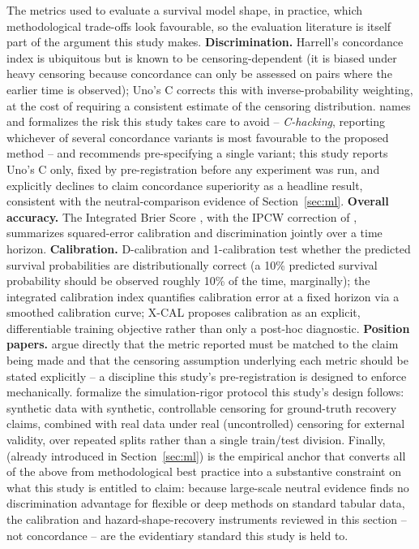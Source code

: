 \documentclass[11pt]{article}
\begin{document}
The metrics used to evaluate a survival model shape, in practice, which
methodological trade-offs look favourable, so the evaluation literature is
itself part of the argument this study makes. \textbf{Discrimination.}
Harrell's concordance index is ubiquitous but is known to be
censoring-dependent (it is biased under heavy censoring because
concordance can only be assessed on pairs where the earlier time is
observed); Uno's C \citep{uno2011} corrects this with inverse-probability
weighting, at the cost of requiring a consistent estimate of the
censoring distribution. \citet{sonabend2022chacking} names and formalizes
the risk this study takes care to avoid -- \emph{C-hacking}, reporting
whichever of several concordance variants is most favourable to the
proposed method -- and recommends pre-specifying a single variant; this
study reports Uno's C only, fixed by pre-registration before any
experiment was run, and explicitly declines to claim concordance
superiority as a headline result, consistent with the neutral-comparison
evidence of Section~\ref{sec:ml}. \textbf{Overall accuracy.} The
Integrated Brier Score \citep{graf1999ibs}, with the IPCW correction of
\citet{gerds2006}, summarizes squared-error calibration and discrimination
jointly over a time horizon. \textbf{Calibration.} D-calibration and
1-calibration \citep{haider2020} test whether the predicted survival
probabilities are distributionally correct (a 10\% predicted survival
probability should be observed roughly 10\% of the time, marginally); the
integrated calibration index \citep{austin2020ici} quantifies calibration
error at a fixed horizon via a smoothed calibration curve; X-CAL
\citep{goldstein2020xcal} proposes calibration as an explicit,
differentiable training objective rather than only a post-hoc diagnostic.
\textbf{Position papers.} \citet{lillelund2025} argue directly that the
metric reported must be matched to the claim being made and that the
censoring assumption underlying each metric should be stated explicitly
-- a discipline this study's pre-registration is designed to enforce
mechanically. \citet{pearce2022benchmark} formalize the simulation-rigor
protocol this study's design follows: synthetic data with synthetic,
controllable censoring for ground-truth recovery claims, combined with
real data under real (uncontrolled) censoring for external validity, over
repeated splits rather than a single train/test division. Finally,
\citet{burk2024neutral} (already introduced in Section~\ref{sec:ml}) is
the empirical anchor that converts all of the above from methodological
best practice into a substantive constraint on what this study is
entitled to claim: because large-scale neutral evidence finds no
discrimination advantage for flexible or deep methods on standard tabular
data, the calibration and hazard-shape-recovery instruments reviewed in
this section -- not concordance -- are the evidentiary standard this
study is held to.
\end{document}
